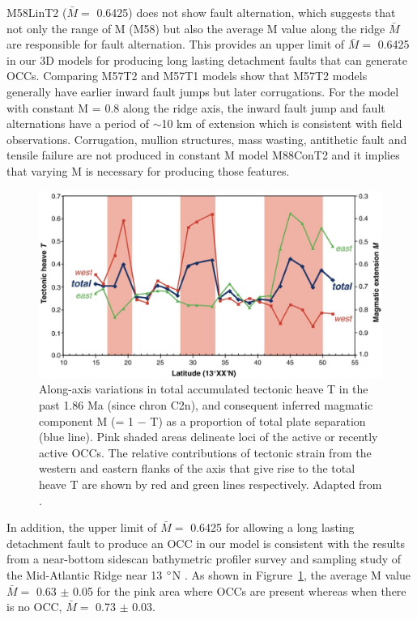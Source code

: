 M58LinT2 ($\bar{M} =$ 0.6425) does not show fault alternation, which suggests that not only the range of M (M58) but also the average M value along the ridge $\bar{M}$ are responsible for fault alternation. This provides an upper limit of $\bar{M} =$ 0.6425 in our 3D models for producing long lasting detachment faults that can generate OCCs. Comparing M57T2 and M57T1 models show that M57T2 models generally have earlier inward fault jumps but later corrugations. For the model with constant M = 0.8 along the ridge axis, the inward fault jump and fault alternations have a period of $\sim$10 km of extension which is consistent with field observations. Corrugation, mullion structures, mass wasting, antithetic fault and tensile failure are not produced in constant M model M88ConT2 and it implies that varying M is necessary for producing those features.

\begin{figure}[h]
 \centering
  \includegraphics[width=1\textwidth]{./Figures/fig_Discussion_ResultsSummary_MacLeod2009.eps}
 \caption[Field observation results adapted from \citep{MacLeod2009}.]{Along-axis variations in total accumulated tectonic heave T in the past 1.86 Ma (since chron C2n), and consequent inferred magmatic component M (= 1 $-$ T) as a proportion of total plate separation (blue line). Pink shaded areas delineate loci of the active or recently active OCCs. The relative contributions of tectonic strain from the western and eastern flanks of the axis that give rise to the total heave T are shown by red and green lines respectively. Adapted from \citep{MacLeod2009}. }
 \label{fig_Discussion_ResultsSummary_MacLeod2009}
\end{figure}

In addition, the upper limit of $\bar{M} = $ 0.6425 for allowing a long lasting detachment fault to produce an OCC in our model is consistent with the results from a near-bottom sidescan bathymetric profiler survey and sampling study of the Mid-Atlantic Ridge near 13 $\degree$N \citep{MacLeod2009}. As shown in Figrure~\hyperref[fig_Discussion_ResultsSummary_MacLeod2009]{\ref{fig_Discussion_ResultsSummary_MacLeod2009}}, the average M value $\bar{M} =$ 0.63 $\pm$ 0.05 for the pink area where OCCs are present whereas when there is no OCC, $\bar{M} =$ 0.73 $\pm$ 0.03.

